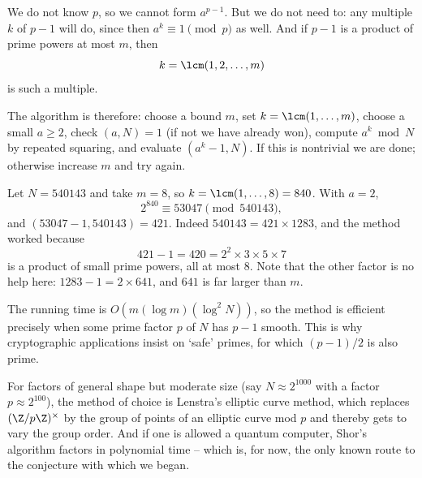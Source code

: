 We do not know $p$, so we cannot form $a^{p-1}$. But we do not need to: any multiple $k$ of $p - 1$ will do, since then $a^k \equiv 1 \pmod p$ as well. And if $p - 1$ is a product of prime powers at most $m$, then
$$
k = \lcm(1, 2, \dots, m)
$$
is such a multiple.

The algorithm is therefore: choose a bound $m$, set $k = \lcm(1,\dots,m)$, choose a small $a \geq 2$, check $(a, N) = 1$ (if not we have already won), compute $a^k \bmod N$ by repeated squaring, and evaluate $(a^k - 1, N)$. If this is nontrivial we are done; otherwise increase $m$ and try again.

\begin{example}
	Let $N = 540143$ and take $m = 8$, so $k = \lcm(1,\dots,8) = 840$. With $a = 2$,
	$$
	2^{840} \equiv 53047 \pmod{540143},
	$$
	and $(53047 - 1, 540143) = 421$. Indeed $540143 = 421\times1283$, and the method worked because
	$$
	421 - 1 = 420 = 2^2\times3\times5\times7
	$$
	is a product of small prime powers, all at most $8$. Note that the other factor is no help here: $1283 - 1 = 2\times641$, and $641$ is far larger than $m$.
\end{example}

\begin{remark}
	The running time is $O(m(\log m)(\log^2N))$, so the method is efficient precisely when some prime factor $p$ of $N$ has $p - 1$ smooth. This is why cryptographic applications insist on `safe' primes, for which $(p-1)/2$ is also prime.

	For factors of general shape but moderate size (say $N \approx 2^{1000}$ with a factor $p \approx 2^{100}$), the method of choice is Lenstra's elliptic curve method, which replaces $(\Z/p\Z)^\times$ by the group of points of an elliptic curve mod $p$ and thereby gets to vary the group order. And if one is allowed a quantum computer, Shor's algorithm factors in polynomial time -- which is, for now, the only known route to the conjecture with which we began.
\end{remark}


